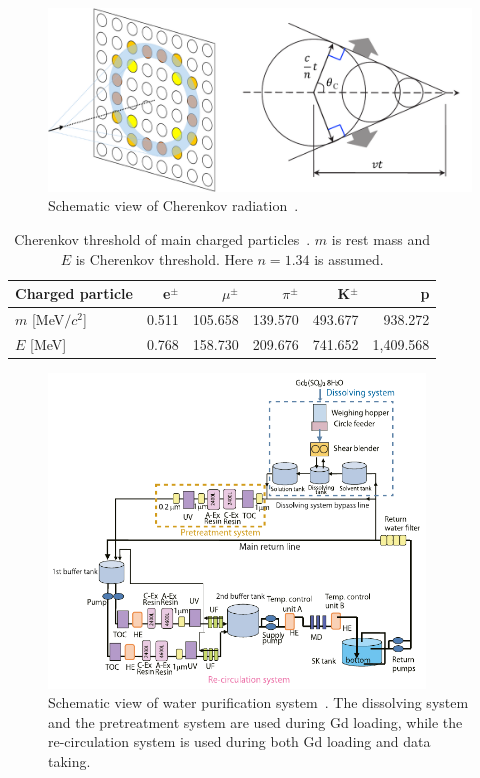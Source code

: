 \begin{figure}[tbp]
	\centering
	\includegraphics[width=14cm]{Figures/SK/Cherenkov_03}
	\caption[Schematic view of Cherenkov radiation]{\label{SK_Cherenkov_03} Schematic view of Cherenkov radiation~\cite{2015Yamamoto}.}
\end{figure}

\begin{table}[h]
	\caption[Cherenkov threshold of main charged particles]{\label{SK_Tab:Che} Cherenkov threshold of main charged particles~\cite{2022Workman}. $m$ is rest mass and $E$ is Cherenkov threshold. Here $n=1.34$ is assumed.}
	\centering
	\vs
	\begin{tabular}{lrrrrr}
		\hline\hline
		Charged particle&e$^{\pm}$&$\mu^{\pm}$&$\pi^{\pm}$&K$^{\pm}$&p\\
		\hline
		$m$ [MeV$/c^{2}$]&0.511&105.658&139.570&493.677&938.272\\
		$E$ [MeV]&0.768&158.730&209.676&741.652&1,409.568\\
		\hline\hline
	\end{tabular}
\end{table}

\begin{figure}[tbp]
	\centering
	\includegraphics[width=10cm]{Figures/SK/Water}
	\caption[Schematic view of water purification system]{\label{SK_Water} Schematic view of water purification system~\cite{2022Abe}. The dissolving system and the pretreatment system are used during Gd loading, while the re-circulation system is used during both Gd loading and data taking.}
\end{figure}

